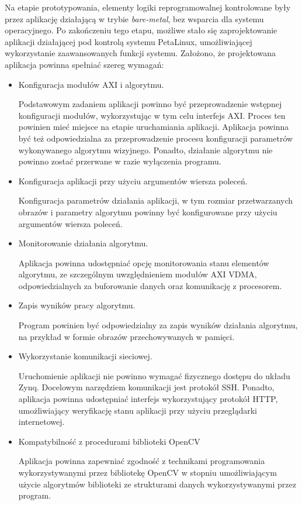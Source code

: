 Na etapie prototypowania, elementy logiki reprogramowalnej kontrolowane były przez aplikację działającą w trybie \textit{bare-metal}, bez wsparcia dla systemu operacyjnego.
Po zakończeniu tego etapu, możliwe stało się zaprojektowanie aplikacji działającej pod kontrolą systemu PetaLinux, umożliwiającej wykorzystanie zaawansowanych funkcji systemu.
Założono, że projektowana aplikacja powinna spełniać szereg wymagań:

\begin{itemize}

	\item Konfiguracja modułów AXI i algorytmu.
	
	Podstawowym zadaniem aplikacji powinno być przeprowadzenie wstępnej konfiguracji modułów, wykorzystując w tym celu interfejs AXI. 
	Proces ten powinien mieć miejsce na etapie uruchamiania aplikacji. 
	Aplikacja powinna być też odpowiedzialna za przeprowadzenie procesu konfiguracji parametrów wykonywanego algorytmu wizyjnego.	
	Ponadto, działanie algorytmu nie powinno zostać przerwane w razie wyłączenia programu.
	
	\item Konfiguracja aplikacji przy użyciu argumentów wiersza poleceń.
	
	Konfiguracja parametrów działania aplikacji, w tym rozmiar przetwarzanych obrazów i parametry algorytmu powinny być konfigurowane przy użyciu argumentów wiersza poleceń.
	
	\item Monitorowanie działania algorytmu.
	
	Aplikacja powinna udostępniać opcję monitorowania stanu elementów algorytmu, ze szczególnym uwzględnieniem modułów AXI VDMA, odpowiedzialnych za buforowanie danych oraz komunikację z procesorem.
	
	\item Zapis wyników pracy algorytmu.
	
	Program powinien być odpowiedzialny za zapis wyników działania algorytmu, na przykład w formie obrazów przechowywanych w pamięci.
	
	\item Wykorzystanie komunikacji sieciowej.
	
	Uruchomienie aplikacji nie powinno wymagać fizycznego dostępu do układu Zynq. 
	Docelowym narzędziem komunikacji jest protokół SSH. 
	Ponadto, aplikacja powinna udostępniać interfejs wykorzystujący protokół HTTP, umożliwiający weryfikację stanu aplikacji przy użyciu przeglądarki internetowej.
	
	\item Kompatybilność z procedurami biblioteki OpenCV
	
	Aplikacja powinna zapewniać zgodność z technikami programowania wykorzystywanymi przez bibliotekę OpenCV w stopniu umożliwiającym użycie algorytmów biblioteki ze strukturami danych wykorzystywanymi przez program.
\end{itemize}

